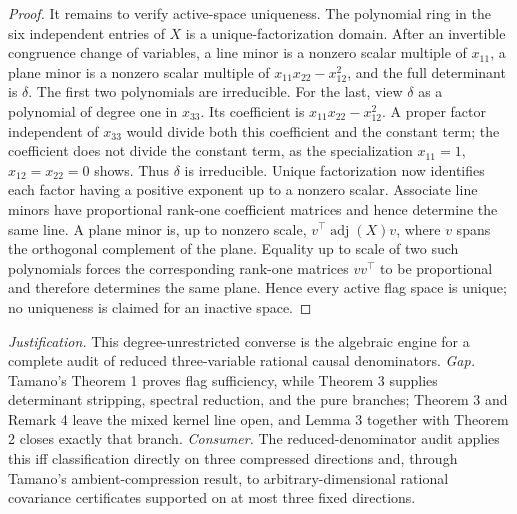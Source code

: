 \documentclass{article}
\begin{document}
\begin{proof}
It remains to verify active-space uniqueness.  The polynomial ring in
the six independent entries of \(X\) is a unique-factorization domain.
After an invertible congruence change of variables, a line minor is a
nonzero scalar multiple of \(x_{11}\), a plane minor is a nonzero
scalar multiple of \(x_{11}x_{22}-x_{12}^2\), and the full determinant
is \(\delta\).  The first two polynomials are irreducible.  For the last,
view \(\delta\) as a polynomial of degree one in \(x_{33}\).  Its
coefficient is \(x_{11}x_{22}-x_{12}^2\).  A proper factor independent
of \(x_{33}\) would divide both this coefficient and the constant term;
the coefficient does not divide the constant term, as the specialization
\(x_{11}=1\), \(x_{12}=x_{22}=0\) shows.  Thus \(\delta\) is
irreducible.  Unique factorization now identifies each factor having a
positive exponent up to a nonzero scalar.  Associate line minors have
proportional rank-one coefficient matrices and hence determine the same
line.  A plane minor is, up to nonzero scale,
\(v^{\top}\operatorname{adj}(X)v\), where \(v\) spans the orthogonal
complement of the plane.  Equality up to scale of two such polynomials
forces the corresponding rank-one matrices \(vv^{\top}\) to be
proportional and therefore determines the same plane.  Hence every
active flag space is unique; no uniqueness is claimed for an inactive
space.
\end{proof}
\par\smallskip\noindent \textit{Justification.} This degree-unrestricted converse is the algebraic engine for a complete audit of reduced three-variable rational causal denominators. \textit{Gap.} Tamano's Theorem 1 proves flag sufficiency, while Theorem 3 supplies determinant stripping, spectral reduction, and the pure branches; Theorem 3 and Remark 4 leave the mixed kernel line open, and Lemma 3 together with Theorem 2 closes exactly that branch. \textit{Consumer.} The reduced-denominator audit applies this iff classification directly on three compressed directions and, through Tamano's ambient-compression result, to arbitrary-dimensional rational covariance certificates supported on at most three fixed directions.
\end{document}
